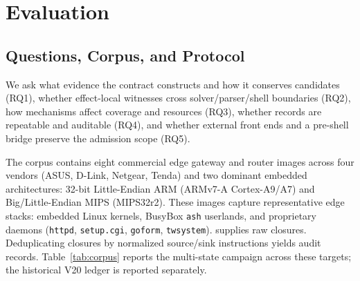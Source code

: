 \section{Evaluation}
\label{sec:evaluation}

\subsection{Questions, Corpus, and Protocol}

We ask what evidence the contract constructs and how it conserves candidates
(RQ1), whether effect-local witnesses cross solver/parser/shell boundaries
(RQ2), how mechanisms affect coverage and resources (RQ3), whether records are
repeatable and auditable (RQ4), and whether external front ends and a pre-shell
bridge preserve the admission scope (RQ5).

The corpus contains eight commercial edge gateway and router images across four vendors (ASUS, D-Link, Netgear, Tenda) and two dominant embedded architectures: 32-bit Little-Endian ARM (ARMv7-A Cortex-A9/A7) and Big/Little-Endian MIPS (MIPS32r2). These images capture representative edge stacks: embedded Linux kernels, BusyBox \texttt{ash} userlands, and proprietary daemons (\texttt{httpd}, \texttt{setup.cgi}, \texttt{goform}, \texttt{twsystem}). \mango supplies \TSDSReviewCampaignClosures{} raw closures. Deduplicating closures by normalized source/sink instructions yields \TSDSReviewCampaignRecords{} audit records. Table~\ref{tab:corpus} reports the multi-state campaign across these targets; the historical V20 ledger is reported separately.

